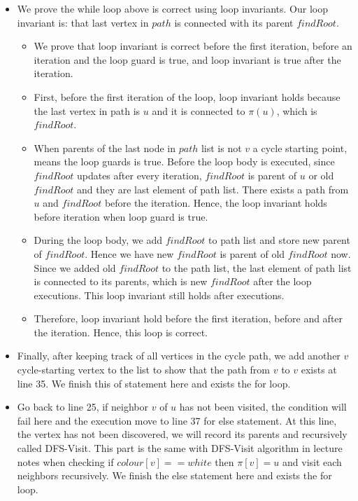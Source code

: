 \documentclass{cpsc413Solutions}
\begin{document}
\begin{problemlist}
\begin{problem}
\begin{answer}
\begin{enumerate}
\begin{itemize}
        \item We prove the while loop above is correct using loop invariants. Our loop invariant is: that last vertex in $path$ is connected with its parent $findRoot$.
        
        \begin{itemize}
            \item We prove that loop invariant is correct before the first iteration, before an iteration and the loop guard is true, and loop invariant is true after the iteration.
            
            \item First, before the first iteration of the loop, loop invariant holds because the last vertex in path is $u$ and it is connected to $\pi(u)$, which is $findRoot$.
            
            \item  When parents of the last node in $path$ list is not $v$ a cycle starting point, means the loop guards is true. Before the loop body is executed, since $findRoot$ updates after every iteration, $findRoot$ is parent of $u$ or old $findRoot$ and they are last element of path list. There exists a path from $u$ and $findRoot$ before the iteration. Hence, the loop invariant holds before iteration when loop guard is true.
            
            \item During the loop body, we add $findRoot$ to path list and store new parent of $findRoot$. Hence we have new $findRoot$ is parent of old $findRoot$ now. Since we added old $findRoot$ to the path list, the last element of path list is connected to its parents, which is new $findRoot$ after the loop executions. This loop invariant still holds after executions.
            
            \item Therefore, loop invariant hold before the first iteration, before and after the iteration. Hence, this loop is correct.
        \end{itemize}
        
        \item Finally, after keeping track of all vertices in the cycle path, we add another $v$ cycle-starting vertex to the list to show that the path from $v$ to $v$ exists at line 35. We finish this of statement here and exists the for loop.
        
        \item Go back to line 25, if neighbor $v$ of $u$ has not been visited, the condition will fail here and the execution move to line 37 for else statement. At this line, the vertex has not been discovered, we will record its parents and recursively called DFS-Visit. This part is the same with DFS-Visit algorithm in lecture notes when checking if $colour[v] == white$ then $\pi[v]=u$ and visit each neighbors recursively. We finish the else statement here and exists the for loop.
        

\end{itemize}
\end{enumerate}
\end{answer}
\end{problem}
\end{problemlist}
\end{document}
